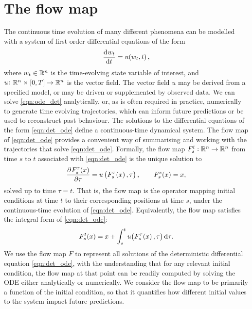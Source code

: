 \section{The flow map}
The continuous time evolution of many different phenomena can be modelled with a system of first order differential equations of the form
\begin{equation}\label{eqn:det_ode}
	\dod{w_t}{t} = u\!\left(w_t, t\right),
\end{equation}
where \(w_t \in \mathbb{R}^n\) is the time-evolving state variable of interest, and \(u \colon \mathbb{R}^n \times [0,T] \to \mathbb{R}^n\) is the vector field.
The vector field \(u\) may be derived from a specified model, or may be driven or supplemented by observed data.
We can solve \cref{eqn:ode_det} analytically, or, as is often required in practice, numerically to generate time evolving trajectories, which can inform future predictions or be used to reconstruct past behaviour.
The solutions to the differential equations of the form \cref{eqn:det_ode} define a continuous-time dynamical system.
The flow map of \cref{eqn:det_ode} provides a convenient way of summarising and working with the trajectories that solve \cref{eqn:det_ode}.
Formally, the flow map \(F_{s}^{t}: \mathbb{R}^n \to \mathbb{R}^n\) from time \(s\) to \(t\) associated with \cref{eqn:det_ode} is the unique solution to
\begin{equation}
	\dpd{F_{s}^{\tau}\!\left(x\right)}{\tau} = u\left(F_{s}^\tau\!\left(x\right), \tau\right), \qquad F_{s}^{s}\!\left(x\right) = x,
	\label{eqn:flow_map_ode}
\end{equation}
solved up to time \(\tau = t\).
That is, the flow map is the operator mapping initial conditions at time \(t\) to their corresponding positions at time \(s\), under the continuous-time evolution of \cref{eqn:det_ode}.
Equivalently, the flow map satisfies the integral form of \cref{eqn:det_ode}:
\begin{equation}\label{eqn:flow_map_int}
	F_s^t\!\left(x\right) = x + \int_s^t{u\!\left(F_s^{\tau}\!\left(x\right), \tau\right)\dif \tau}.
\end{equation}
We use the flow map \(F\) to represent all solutions of the deterministic differential equation \cref{eqn:det_ode}, with the understanding that for any relevant initial condition, the flow map at that point can be readily computed by solving the ODE either analytically or numerically.
We consider the flow map to be primarily a function of the initial condition, so that it quantifies how different initial values to the system impact future predictions.
